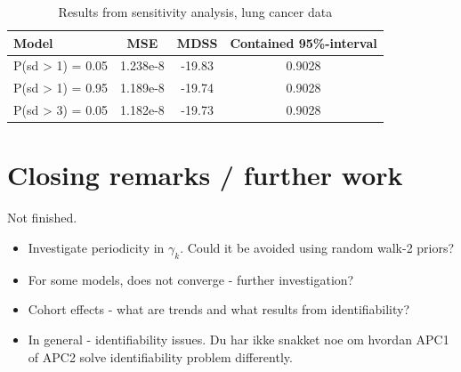\begin{table}
    \begin{center}
        \begin{tabular}{l |c c c }
        Model & MSE &   MDSS & Contained 95\%-interval\\
        \hline
        P(sd > 1) = 0.05 & 1.238e-8 & -19.83    & 0.9028 \\
        P(sd > 1) = 0.95 & 1.189e-8 & -19.74    & 0.9028 \\
        P(sd > 3) = 0.05 & 1.182e-8 & -19.73    & 0.9028 \\
        \end{tabular}
    \caption{Results from sensitivity analysis, lung cancer data}\label{tbl:mv-sensitivity-lung}
    \end{center}
\end{table}

\newpage
\section{Closing remarks / further work}
\label{sec:closingRemarks}
\textcolor{myDarkBlue}{Not finished.}
\begin{itemize}
    \item Investigate periodicity in $\gamma_k$. Could it be avoided using random walk-2 priors? 
    \item For some models, \inlabru does not converge - further investigation? 
    \item Cohort effects - what are trends and what results from identifiability? 
    
    \item In general - identifiability issues. Du har ikke snakket noe om hvordan APC1 of APC2 solve identifiability problem differently. 
\end{itemize}
